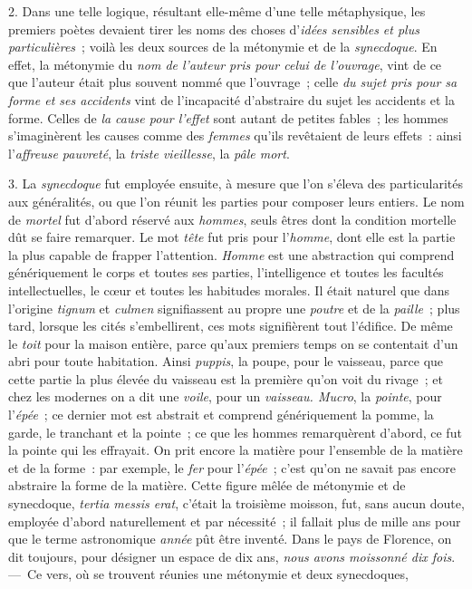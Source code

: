 \documentclass[french,twoside]{book} %
\begin{document}
2. Dans une telle logique, résultant elle-même d’une telle métaphysique, les premiers poètes devaient tirer les noms des choses d’{\itshape idées sensibles et plus particulières} ; voilà les deux sources de la métonymie et de la {\itshape synecdoque}. En effet, la métonymie du {\itshape nom de l’auteur pris pour celui de l’ouvrage}, vint de ce que l’auteur était plus souvent nommé que l’ouvrage ; celle {\itshape du sujet pris pour sa forme et ses accidents} vint de l’incapacité d’abstraire du sujet les accidents et la forme. Celles de {\itshape la cause pour l’effet} sont autant de petites fables ; les hommes s’imaginèrent les causes comme des {\itshape femmes} qu’ils revêtaient de leurs effets : ainsi l’{\itshape affreuse pauvreté}, la {\itshape triste vieillesse}, la {\itshape pâle mort}.\par
3. La {\itshape synecdoque} fut employée ensuite, à mesure que l’on s’éleva des particularités aux généralités, ou que l’on réunit les parties pour composer leurs entiers. Le nom de {\itshape mortel} fut d’abord réservé aux {\itshape hommes}, seuls êtres dont la condition mortelle dût se faire remarquer. Le mot {\itshape tête} fut pris pour l’{\itshape homme}, dont elle est la partie la plus capable de frapper l’attention. {\itshape Homme} est une abstraction qui comprend génériquement le corps et toutes ses parties, l’intelligence et toutes les facultés intellectuelles, le cœur et toutes les habitudes morales. Il était naturel que dans l’origine {\itshape tignum} et {\itshape culmen} signifiassent au propre une {\itshape poutre} et de la {\itshape paille} ; plus tard, lorsque les cités s’embellirent, ces mots signifièrent tout l’édifice. De même le {\itshape toit} pour la maison entière,  parce qu’aux premiers temps on se contentait d’un abri pour toute habitation. Ainsi {\itshape puppis}, la poupe, pour le vaisseau, parce que cette partie la plus élevée du vaisseau est la première qu’on voit du rivage ; et chez les modernes on a dit une {\itshape voile}, pour un {\itshape vaisseau. Mucro}, la {\itshape pointe}, pour l’{\itshape épée} ; ce dernier mot est abstrait et comprend génériquement la pomme, la garde, le tranchant et la pointe ; ce que les hommes remarquèrent d’abord, ce fut la pointe qui les effrayait. On prit encore la matière pour l’ensemble de la matière et de la forme : par exemple, le {\itshape fer} pour l’{\itshape épée} ; c’est qu’on ne savait pas encore abstraire la forme de la matière. Cette figure mêlée de métonymie et de synecdoque, {\itshape tertia messis erat}, c’était la troisième moisson, fut, sans aucun doute, employée d’abord naturellement et par nécessité ; il fallait plus de mille ans pour que le terme astronomique {\itshape année} pût être inventé. Dans le pays de Florence, on dit toujours, pour désigner un espace de dix ans, {\itshape nous avons moissonné dix fois}. — Ce vers, où se trouvent réunies une métonymie et deux synecdoques,\par
\end{document}
